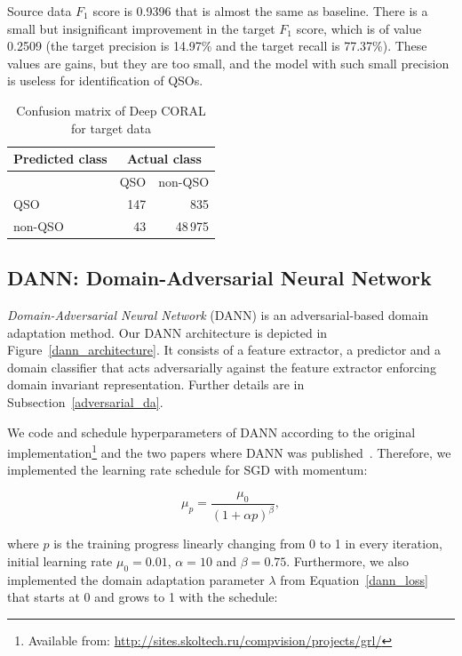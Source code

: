 Source data \(F_1\) score is 0.9396 that is almost the same as baseline.
There is a small but insignificant improvement in the target \(F_1\) score,
which is of value 0.2509
(the target precision is 14.97\% and the target recall is 77.37\%).
These values are gains, but they are too small,
and the model with such small precision is useless for identification of QSOs.

\begin{table}
\begin{center}
\begin{tabular}{|l|r|r|}
	\hline
	Predicted class & \multicolumn{2}{c|}{Actual class} \\
	\hline \hline
	& QSO & non-QSO \\ \hline
	QSO & 147 & 835 \\ \hline
	non-QSO & 43 & 48\,975 \\ \hline
\end{tabular}
\end{center}
\caption{Confusion matrix of Deep CORAL for target data}
\end{table}

\subsection{DANN: Domain-Adversarial Neural Network}

\textit{Domain-Adversarial Neural Network} (DANN) is an adversarial-based domain adaptation method.
Our DANN architecture is depicted in Figure~\ref{dann_architecture}.
It consists of a feature extractor, a predictor and a domain classifier
that acts adversarially against the feature extractor
enforcing domain invariant representation.
Further details are in Subsection~\ref{adversarial_da}.

We code and schedule hyperparameters of DANN according to the original
implementation\footnote{Available from: \url{http://sites.skoltech.ru/compvision/projects/grl/}}
and the two papers where DANN was published~\cite{ganin2016, ganin2015}.
Therefore, we implemented the learning rate schedule for SGD with momentum:

\begin{equation}
	\mu_p = \frac{\mu_0}{(1 + \alpha p)^\beta},
\end{equation}

where \(p\) is the training progress linearly changing from 0 to 1 in every iteration,
initial learning rate \(\mu_0 = 0.01\), \(\alpha = 10\) and \(\beta = 0.75\).
Furthermore, we also implemented the domain adaptation parameter \(\lambda\) from Equation~\ref{dann_loss} that starts at 0 and grows to 1 with the schedule:

